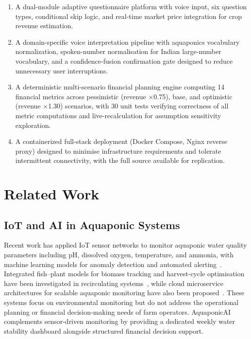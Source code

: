 \documentclass[conference]{IEEEtran}
\begin{document}
\begin{enumerate}
  \item A dual-module adaptive questionnaire platform with voice
        input, six question types, conditional skip logic, and
        real-time market price integration for crop revenue estimation.

  \item A domain-specific voice interpretation pipeline with
        aquaponics vocabulary normalization, spoken-number normalisation
        for Indian large-number vocabulary, and a confidence-fusion
        confirmation gate designed to reduce unnecessary user interruptions.

  \item A deterministic multi-scenario financial planning engine
        computing 14 financial metrics across pessimistic
        (revenue $\times$0.75), base, and optimistic
        (revenue $\times$1.30) scenarios, with 30 unit tests
        verifying correctness of all metric computations and
        live-recalculation for assumption sensitivity exploration.

  \item A containerized full-stack deployment (Docker Compose,
        Nginx reverse proxy) designed to minimise infrastructure
        requirements and tolerate intermittent connectivity, with
        the full source available for replication.
\end{enumerate}


\section{Related Work}
\label{sec:related}

\subsection{IoT and AI in Aquaponic Systems}

Recent work has applied IoT sensor networks to monitor aquaponic
water quality parameters including pH, dissolved oxygen, temperature,
and ammonia, with machine learning models for anomaly detection and
automated alerting~\cite{ref6,ref12,ref14}. Integrated fish--plant
models for biomass tracking and harvest-cycle optimisation have been
investigated in recirculating systems~\cite{ref19}, while cloud
microservice architectures for scalable aquaponic monitoring have
also been proposed~\cite{ref13}. These systems focus on environmental
monitoring but do not address the operational planning or financial
decision-making needs of farm operators. AquaponicAI complements
sensor-driven monitoring by providing a dedicated weekly water
stability dashboard alongside structured financial decision support.
\end{document}
